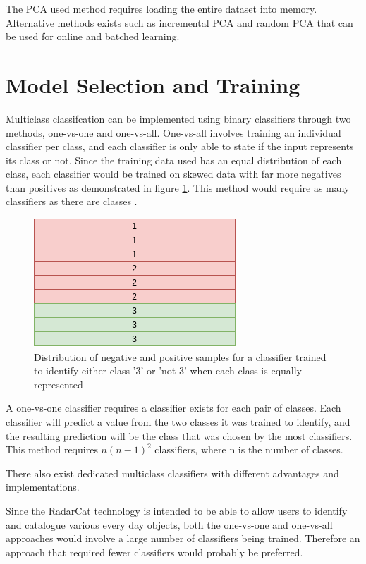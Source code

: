 \documentclass[12pt]{article}
\begin{document}
The PCA used method requires loading the entire dataset into memory. Alternative methods exists such as incremental PCA and random PCA that can be used for online and batched learning.

\section{Model Selection and Training}

Multiclass classifcation can be implemented using binary classifiers through two methods, one-vs-one and one-vs-all. One-vs-all involves training an individual classifier per class, and each classifier is only able to state if the input represents its class or not. Since the training data used has an equal distribution of each class, each classifier would be trained on skewed data with far more negatives than positives as demonstrated in figure \ref{fig:classifierperclass}. This method would require as many classifiers as there are classes \cite{handson}.

\begin{figure}[!ht]
	\centering
	\includegraphics[width=0.5\linewidth]{images/classifierperclass}
	\caption{Distribution of negative and positive samples for a classifier trained to identify either class '3' or 'not 3' when each class is equally represented}
	\label{fig:classifierperclass}
\end{figure}

A one-vs-one classifier requires a classifier exists for each pair of classes. Each classifier will predict a value from the two classes it was trained to identify, and the resulting prediction will be the class that was chosen by the most classifiers. This method requires $n (n - 1)^2$ classifiers, where n is the number of classes.

There also exist dedicated multiclass classifiers with different advantages and implementations.

Since the RadarCat \cite{radarcat} technology is intended to be able to allow users to identify and catalogue various every day objects, both the one-vs-one and one-vs-all approaches would involve a large number of classifiers being trained. Therefore an approach that required fewer classifiers would probably be preferred. 
\end{document}
